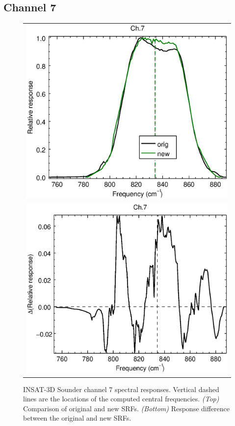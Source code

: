 \subsection{Channel 7}
\begin{figure}[H]
  \centering
  \begin{tabular}{c}
    \includegraphics[scale=0.55]{graphics/sndr/srf/sndr_insat3d-7.eps} \\
    \includegraphics[scale=0.55]{graphics/sndr/srf/sndr_insat3d-7.difference.eps}
  \end{tabular}
  \caption{INSAT-3D Sounder channel 7 spectral responses. Vertical dashed lines are the locations of the computed central frequencies. \emph{(Top)} Comparison of original and new SRFs. \emph{(Bottom)} Response difference between the original and new SRFs.}
  \label{fig:sndr_ch7}
\end{figure}

